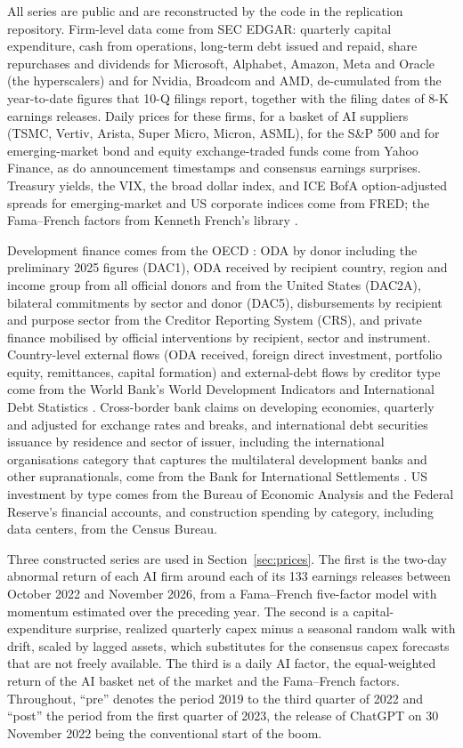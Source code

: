 \documentclass[AER]{AEA}
\begin{document}
All series are public and are reconstructed by the code in the replication repository. Firm-level data come from SEC EDGAR: quarterly capital expenditure, cash from operations, long-term debt issued and repaid, share repurchases and dividends for Microsoft, Alphabet, Amazon, Meta and Oracle (the hyperscalers) and for Nvidia, Broadcom and AMD, de-cumulated from the year-to-date figures that 10-Q filings report, together with the filing dates of 8-K earnings releases. Daily prices for these firms, for a basket of AI suppliers (TSMC, Vertiv, Arista, Super Micro, Micron, ASML), for the S\&P 500 and for emerging-market bond and equity exchange-traded funds come from Yahoo Finance, as do announcement timestamps and consensus earnings surprises. Treasury yields, the VIX, the broad dollar index, and ICE BofA option-adjusted spreads for emerging-market and US corporate indices come from FRED; the Fama--French factors from Kenneth French's library \citep{Fama1993}.

Development finance comes from the OECD \citep{OECD2026CRS}: ODA by donor including the preliminary 2025 figures (DAC1), ODA received by recipient country, region and income group from all official donors and from the United States (DAC2A), bilateral commitments by sector and donor (DAC5), disbursements by recipient and purpose sector from the Creditor Reporting System (CRS), and private finance mobilised by official interventions by recipient, sector and instrument. Country-level external flows (ODA received, foreign direct investment, portfolio equity, remittances, capital formation) and external-debt flows by creditor type come from the World Bank's World Development Indicators and International Debt Statistics \citep{WB2026IDS}. Cross-border bank claims on developing economies, quarterly and adjusted for exchange rates and breaks, and international debt securities issuance by residence and sector of issuer, including the international organisations category that captures the multilateral development banks and other supranationals, come from the Bank for International Settlements \citep{BIS2026IDS}. US investment by type comes from the Bureau of Economic Analysis and the Federal Reserve's financial accounts, and construction spending by category, including data centers, from the Census Bureau.

Three constructed series are used in Section~\ref{sec:prices}. The first is the two-day abnormal return of each AI firm around each of its 133 earnings releases between October 2022 and November 2026, from a Fama--French five-factor model with momentum estimated over the preceding year. The second is a capital-expenditure surprise, realized quarterly capex minus a seasonal random walk with drift, scaled by lagged assets, which substitutes for the consensus capex forecasts that are not freely available. The third is a daily AI factor, the equal-weighted return of the AI basket net of the market and the Fama--French factors. Throughout, ``pre'' denotes the period 2019 to the third quarter of 2022 and ``post'' the period from the first quarter of 2023, the release of ChatGPT on 30 November 2022 being the conventional start of the boom.
\end{document}
